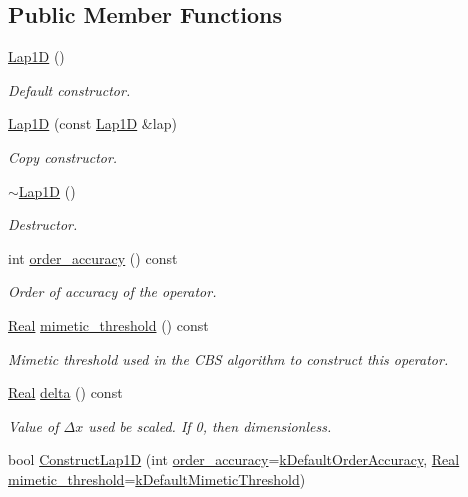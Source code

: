 \subsection*{Public Member Functions}
\begin{DoxyCompactItemize}
\item 
\hyperlink{classmtk_1_1Lap1D_a6fc2aeea35d4dfa49f17e625411f5a70}{Lap1\+D} ()
\begin{DoxyCompactList}\small\item\em Default constructor. \end{DoxyCompactList}\item 
\hyperlink{classmtk_1_1Lap1D_a95c3fdcd0c9e4c56e775a2a20a2fac42}{Lap1\+D} (const \hyperlink{classmtk_1_1Lap1D}{Lap1\+D} \&lap)
\begin{DoxyCompactList}\small\item\em Copy constructor. \end{DoxyCompactList}\item 
\hyperlink{classmtk_1_1Lap1D_ac0cb868243a66658cc46de5b818fa4e8}{$\sim$\+Lap1\+D} ()
\begin{DoxyCompactList}\small\item\em Destructor. \end{DoxyCompactList}\item 
int \hyperlink{classmtk_1_1Lap1D_ae3490534a9e950df3f81b3840c31b13a}{order\+\_\+accuracy} () const 
\begin{DoxyCompactList}\small\item\em Order of accuracy of the operator. \end{DoxyCompactList}\item 
\hyperlink{group__c01-roots_gac080bbbf5cbb5502c9f00405f894857d}{Real} \hyperlink{classmtk_1_1Lap1D_a957ae4ff6053d605ac7b93650ad6f188}{mimetic\+\_\+threshold} () const 
\begin{DoxyCompactList}\small\item\em Mimetic threshold used in the C\+B\+S algorithm to construct this operator. \end{DoxyCompactList}\item 
\hyperlink{group__c01-roots_gac080bbbf5cbb5502c9f00405f894857d}{Real} \hyperlink{classmtk_1_1Lap1D_a4e16e80c6dd845ac42bda23385a1c56e}{delta} () const 
\begin{DoxyCompactList}\small\item\em Value of $ \Delta x $ used be scaled. If 0, then dimensionless. \end{DoxyCompactList}\item 
bool \hyperlink{classmtk_1_1Lap1D_a685dcba88c08cf5b7b6c2aa4669a472c}{Construct\+Lap1\+D} (int \hyperlink{classmtk_1_1Lap1D_ae3490534a9e950df3f81b3840c31b13a}{order\+\_\+accuracy}=\hyperlink{group__c01-roots_ga0d95560098eb36420511103637b6952f}{k\+Default\+Order\+Accuracy}, \hyperlink{group__c01-roots_gac080bbbf5cbb5502c9f00405f894857d}{Real} \hyperlink{classmtk_1_1Lap1D_a957ae4ff6053d605ac7b93650ad6f188}{mimetic\+\_\+threshold}=\hyperlink{group__c01-roots_ga35718d949bdc81a08a9cc8ebbe3478a2}{k\+Default\+Mimetic\+Threshold})

\end{DoxyCompactItemize}
